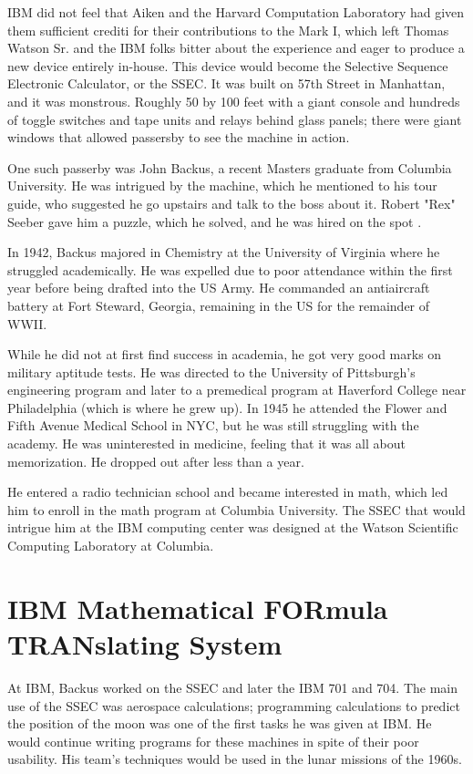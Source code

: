 IBM did not feel that Aiken and the Harvard Computation Laboratory had
given them sufficient crediti for their contributions to the Mark I,
which left Thomas Watson Sr. and the IBM folks bitter about the experience
and eager to produce a new device entirely in-house.
This device would become the Selective Sequence Electronic Calculator, or the SSEC.
It was built on 57th Street in Manhattan, and it was monstrous.
Roughly 50 by 100 feet with a giant console and hundreds of toggle switches and
tape units and relays behind glass panels; there were giant windows that allowed
passersby to see the machine in action.

One such passerby was John Backus, a recent Masters graduate from Columbia University.
He was intrigued by the machine, which he mentioned to his tour guide,
who suggested he go upstairs and talk to the boss about it.
Robert "Rex" Seeber gave him a puzzle, which he solved, and he was hired on the spot
\cite{backus_oral_history_2006}.

In 1942, Backus majored in Chemistry at the University of Virginia where he 
struggled academically. He was expelled due to poor attendance within the first 
year before being drafted into the US Army.
He commanded an antiaircraft battery at Fort Steward, Georgia, remaining in the 
US for the remainder of WWII.

While he did not at first find success in academia, he got very good marks on 
military aptitude tests. He was directed to the University of Pittsburgh's 
engineering program and later to a premedical program at Haverford College near 
Philadelphia (which is where he grew up). In 1945 he attended the Flower and 
Fifth Avenue Medical School in NYC, but he was still struggling with the 
academy.
He was uninterested in medicine, feeling that it was all about memorization. He 
dropped out after less than a year.

He entered a radio technician school and became interested in math, which led 
him to enroll in the math program at Columbia University. The SSEC that would 
intrigue him at the IBM computing center was designed at the Watson Scientific 
Computing Laboratory at Columbia.

\section{IBM Mathematical FORmula TRANslating System}

At IBM, Backus worked on the SSEC and later the IBM 701 and 704.
The main use of the SSEC was aerospace calculations;
programming calculations to predict the position of the moon was
one of the first tasks he was given at IBM.
He would continue writing programs for these machines in spite of their
poor usability.
His team's techniques would be used in the lunar missions of the 1960s.

